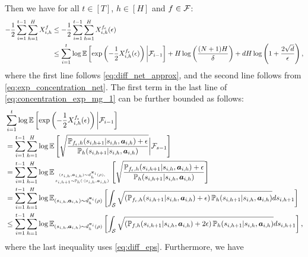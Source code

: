Then we have for all $t\in[T]$, $h\in[H]$ and $f\in{\mathcal{F}}$:
\begin{align}\label{eq:concentration_exp_mg_1}
    -\frac{1}{2}\sum_{i=1}^{t-1}\sum_{h=1}^H X_{i,h}^f& \leq  -\frac{1}{2}\sum_{i=1}^{t-1}\sum_{h=1}^H X^{f_\epsilon}_{i,h}(\epsilon)\notag\\
    & \leq  \sum_{i=1}^t \log\mathbb{E}\left[\exp\left(-\frac{1}{2}X^{f_\epsilon}_{i,h}(\epsilon)\right)\bigg|{\mathcal{F}}_{i-1}\right] + H\log\left(\frac{(N+1)H}{\delta}\right) + dH\log\left(1+\frac{2\sqrt{d}}{\epsilon}\right),
\end{align}
where the first line follows \eqref{eq:diff_net_approx}, and the second line follows from \eqref{eq:exp_concentration_net}. The first term in the last line of \eqref{eq:concentration_exp_mg_1} can be further bounded as follows:
\begin{align}\label{eq:concentration_exp_mg_part}
    &\sum_{i=1}^t \log\mathbb{E}\left[\exp\left(-\frac{1}{2}X^{f_\epsilon}_{i,h}(\epsilon)\right)\bigg|{\mathcal{F}}_{i-1}\right]\notag\\
    &=\sum_{i=1}^{t-1}\sum_{h=1}^H \log\mathbb{E}\left[\sqrt{\frac{{\mathbb P}_{f_\epsilon,h}(s_{i,h+1}|s_{i,h},{\bm{a}}_{i,h})+\epsilon}{{\mathbb P}_h(s_{i,h+1}|s_{i,h},{\bm{a}}_{i,h})}}\bigg|{\mathcal{F}}_{s-1}\right]\notag\\
    &=\sum_{i=1}^{t-1}\sum_{h=1}^H \log\mathbb{E}_{(s_{i,h},{\bm{a}}_{i,h})\sim d_h^{{\bm{\pi}}_i}(\rho),\atop s_{i,h+1}\sim{\mathbb P}_h(\cdot|s_{i,h},{\bm{a}}_{i,h})}\left[\sqrt{\frac{{\mathbb P}_{f_\epsilon,h}(s_{i,h+1}|s_{i,h},{\bm{a}}_{i,h})+\epsilon}{{\mathbb P}_h(s_{i,h+1}|s_{i,h},{\bm{a}}_{i,h})}}\right]\notag\\
    &=\sum_{i=1}^{t-1}\sum_{h=1}^H \log\mathbb{E}_{(s_{i,h},{\bm{a}}_{i,h})\sim d_h^{{\bm{\pi}}_i}(\rho)}\left[\int_{\mathcal{S}}\sqrt{\left({\mathbb P}_{f_\epsilon,h}(s_{i,h+1}|s_{i,h},{\bm{a}}_{i,h})+\epsilon\right){\mathbb P}_h(s_{i,h+1}|s_{i,h},{\bm{a}}_{i,h})} ds_{i,h+1}\right]\notag\\
    & \leq  \sum_{i=1}^{t-1}\sum_{h=1}^H \log\mathbb{E}_{(s_{i,h},{\bm{a}}_{i,h})\sim d_h^{{\bm{\pi}}_i}(\rho)}\left[\int_{\mathcal{S}}\sqrt{\left({\mathbb P}_{f,h}(s_{i,h+1}|s_{i,h},{\bm{a}}_{i,h})+2\epsilon\right){\mathbb P}_h(s_{i,h+1}|s_{i,h},{\bm{a}}_{i,h})} ds_{i,h+1}\right],
\end{align}
where the last inequality uses \eqref{eq:diff_eps}. Furthermore, we have
